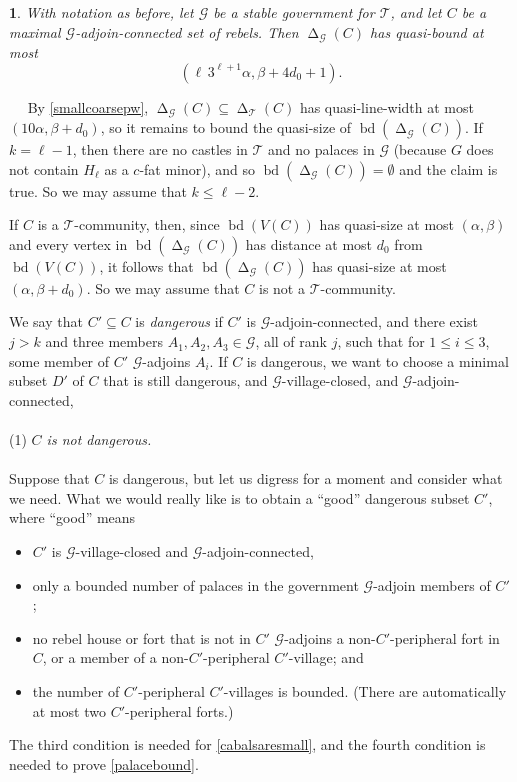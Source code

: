 \documentclass[titlepage,11pt]{article}
\newcommand{\voro}{\operatorname{\Delta}}
\newcommand{\bd}{\operatorname{bd}}
\newcommand{\mac}{\mathcal}
\newtheorem{thm}{}[section]
\newcommand{\Proof}{\noindent{\bf Proof.}\ \ }
\begin{document}
	\begin{thm}\label{notmuchleft}
		With notation as before, 
		let $\mac G$ be a stable government for $\mac T$, and
		let $C$ be a maximal $\mac G$-adjoin-connected set of rebels. Then
		$\voro_{\mac G}(C)$ has quasi-bound at most 
		$$\left(\ell\,3^{\ell+1}\alpha, \beta+4d_0+1\right).$$
	\end{thm}
	\Proof
	By \ref{smallcoarsepw}, $\voro_{\mac G}(C)\subseteq \voro_{\mac T}(C)$ has quasi-line-width at most $(10\alpha,\beta+d_0)$, so it remains to bound the quasi-size of $\bd(\voro_{\mac G}(C))$. If $k=\ell-1$, then there are no castles in $\mac T$ and no palaces in $\mac G$ 
	(because $G$ does not contain $H_{\ell}$ as a $c$-fat minor), and so $\bd(\voro_{\mac G}(C))=\emptyset$
	and the claim is true. So we may assume that $k\le \ell-2$.
	
	If $C$ is a $\mac T$-community, then, since $\bd(V(C))$ has quasi-size at most $(\alpha,\beta)$ and every vertex in $\bd(\voro_{\mac G}(C))$ has distance at most
	$d_0$ from $\bd(V(C))$, it follows that $\bd(\voro_{\mac G}(C))$ has quasi-size at most $(\alpha,\beta+d_0)$.
	So we may assume that $C$ is not a $\mac T$-community.
	
	We say that $C'\subseteq C$ is {\em dangerous} if $C'$ is $\mac G$-adjoin-connected, and 
	there exist $j>k$ and three members $A_1,A_2,A_3\in \mac G$, all of rank $j$, such that for $1\le i\le 3$, some member of $C'$ $\mac G$-adjoins $A_i$.
	If $C$ is dangerous, we want to choose a minimal subset $D'$ of $C$ that is still dangerous, and $\mac G$-village-closed, and $\mac G$-adjoin-connected, 
	\\
	\\
	(1) {\em $C$ is not dangerous.}
	\\
	\\
	Suppose that $C$ is dangerous, but let us digress for a moment and consider what we need. What we would really like is to obtain 
	a ``good'' dangerous subset $C'$, where ``good'' means 
	\begin{itemize}
		\item $C'$ is $\mac G$-village-closed and  $\mac G$-adjoin-connected, 
		\item only a bounded number of palaces in the government $\mac G$-adjoin members of $C'$;
		\item no rebel house or fort that is not in $C'$ $\mac G$-adjoins a non-$C'$-peripheral fort in $C$, or a member of a non-$C'$-peripheral $C'$-village; and
		\item the number of $C'$-peripheral $C'$-villages is bounded. (There are automatically at most two $C'$-peripheral forts.)
	\end{itemize}
	The third condition is needed for \ref{cabalsaresmall}, and the fourth condition is needed to prove \ref{palacebound}.
	
\end{document}
